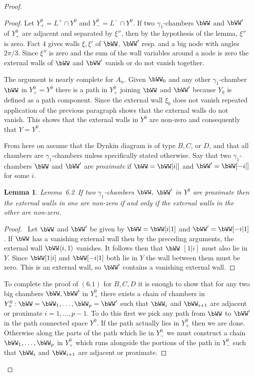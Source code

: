 \documentclass{memo-l}
\newtheorem{lemma}[theorem]{Lemma}
\theoremstyle{definition}
\theoremstyle{remark}
\numberwithin{section}{chapter}
\numberwithin{equation}{chapter}
\begin{document}
\begin{proof}
\begin{proof}
   Let $Y^{0}_{+} = L^{+} \cap Y^{0}$ and $Y^{0}_{-} = L^{-} \cap Y^{0}$.  If
two ${\gamma}_{1}$-chambers $\bWW$ and $\bWW'$ of $Y^{0}_{+}$ are
adjacent and separated by ${\xi''}$, then by the hypothesis of the lemma,
${\xi''}$ is zero.  Fact $4$ gives walls ${\xi}, {\xi}'$ of $\bWW$,
$\bWW'$ resp.  and a big node with angles $2{\pi}/3$.  Since ${\xi''}$
is zero and the sum of the wall variables around a node is zero the
external walls of $\bWW$ and $\bWW'$ 
vanish or do not vanish	together.
 

   The argument is nearly complete for $A_{n}$.  Given $\bWW_{0}$ 
and any
other ${\gamma}_{1}$-chamber $\bWW$ in $Y^{0}_{+} = Y^{0}$ 
there is a path
in $Y_{+}^{0}$ joining $\bWW$ and $\bWW'$ 
because $Y_{0}$ is defined
as a path component.  Since the external wall ${\xi}_{0}$ does not vanish
repeated application of the previous paragraph shows that the external
walls do not vanish.  This shows that the external walls in $Y^{0}$ are
non-zero and consequently that $Y = Y^{0}$.

   From here on assume that the Dynkin diagram is of type $B, C$, or $D$,
and that all chambers are ${\gamma}_{1}$-chambers unless specifically
stated otherwise.  Say that two ${\gamma}_{1}$-chambers $\bWW$ 
and $\bWW'$ are {\it proximate} if 
$\bWW=\bWW[i\vert ]$ and 
$\bWW' =   \bWW[-i\vert ]$ for some $i$.

\medpagebreak

\begin{lemma}{Lemma\ 6.2}\ If two ${\gamma}_{1}$-chambers $\bWW,$
$\bWW'$ in $Y^{0}$ are proximate then the external walls in one are
non-zero if and only if the external walls in the other are non-zero.
\end{lemma}

\medpagebreak

\begin{proof} \ Let $\bWW$ and $\bWW'$ be given by $\bWW
= \bWW[i\vert 1]$ and $\bWW'=\bWW[-i\vert 1]$.  If
$\bWW$ has a vanishing external wall then by the preceding arguments,
the external wall $\bWW\langle i,1\rangle $ vanishes.  It follows then that $\bWW$
$[1\vert i]$ must also lie in $Y$.  Since $\bWW[1\vert i]$ 
and $\bWW[-i\vert 1]$ both lie in $Y$ the wall between them must be zero.  This
is an external wall, so $\bWW'$ contains a vanishing 
external wall.
\end{proof} 


{\medskip}



   To complete the proof of $(6.1)$ for $B, C, D$ it is enough to show that
for any two big chambers $\bWW , \bWW '$ in $Y_{+}^{0}$ there exists a
chain of chambers in $Y_{+}^{0}: \bWW = \bWW _{1},\ldots, \bWW _{p}=
\bWW '$ such that $\bWW _{i}$ and $\bWW _{i+1}$ are adjacent or
proximate $i=1,\ldots ,p-1$.  To do this first we pick any path from 
$\bWW$ to $\bWW '$ in the path connected space $Y^{0}$.  If the path actually
lies in $Y^{0}_{+}$ then we are done.  Otherwise along the parts of the
path which lie in $Y^{0}_{-}$ we must construct a chain $\bWW _{1},\ldots,
\bWW _{p}$ in $Y^{0}_{+}$ which runs alongside the portions of the path
in $Y^{0}_{-}$ such that $\bWW _{i}$ and $\bWW _{i+1}$ are adjacent or
proximate.


\end{proof}
\end{proof}
\end{document}
